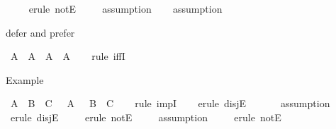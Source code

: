 \begin{isabellebody}
\ \ \ \isamarkupfalse%
\ {\isacharparenleft}{\kern0pt}erule\ notE{\isacharparenright}{\kern0pt}\isanewline
\ \ \ \isamarkupfalse%
\ assumption\isanewline
\ \ \isamarkupfalse%
\ assumption\isanewline
\ \ \isamarkupfalse%
%
\endisatagproof
{\isafoldproof}%
%
\isadelimproof
%
\endisadelimproof
%
\begin{isamarkuptext}%
defer and prefer%
\end{isamarkuptext}\isamarkuptrue%
\isamarkupfalse%
\ {\isachardoublequoteopen}{\isacharparenleft}{\kern0pt}A\ {\isasymor}\ A{\isacharparenright}{\kern0pt}\ {\isacharequal}{\kern0pt}\ {\isacharparenleft}{\kern0pt}A\ {\isasymand}\ A{\isacharparenright}{\kern0pt}{\isachardoublequoteclose}\isanewline
%
\isadelimproof
\ \ %
\endisadelimproof
%
\isatagproof
{}\isamarkupfalse%
\ {\isacharparenleft}{\kern0pt}rule\ iffI{\isacharparenright}{\kern0pt}\isanewline
\ \ \isamarkupfalse%
\ {}\isanewline
\ \ \isamarkupfalse%
\isanewline
\ \ \isamarkupfalse%
%
\endisatagproof
{\isafoldproof}%
%
\isadelimproof
%
\endisadelimproof
%
\begin{isamarkuptext}%
Example%
\end{isamarkuptext}\isamarkuptrue%
\isamarkupfalse%
\ {\isachardoublequoteopen}A\ {\isasymlongrightarrow}\ {\isacharparenleft}{\kern0pt}B\ {\isasymor}\ C{\isacharparenright}{\kern0pt}\ {\isasymlongrightarrow}\ {\isacharparenleft}{\kern0pt}{\isasymnot}\ A\ {\isasymor}\ {\isasymnot}\ B{\isacharparenright}{\kern0pt}\ {\isasymlongrightarrow}\ C{\isachardoublequoteclose}\isanewline
%
\isadelimproof
\ \ %
\endisadelimproof
%
\isatagproof
{}\isamarkupfalse%
\ {\isacharparenleft}{\kern0pt}rule\ impI{\isacharparenright}{\kern0pt}{\isacharplus}{\kern0pt}\isanewline
\ \ \isamarkupfalse%
\ {\isacharparenleft}{\kern0pt}erule\ disjE{\isacharparenright}{\kern0pt}\isanewline
\ \ \ \isamarkupfalse%
\ \isamarkupfalse%
\ assumption\isanewline
\ \ \isamarkupfalse%
\ {\isacharparenleft}{\kern0pt}erule\ disjE{\isacharparenright}{\kern0pt}\isanewline
\ \ \ \isamarkupfalse%
\ {\isacharparenleft}{\kern0pt}erule\ notE{\isacharparenright}{\kern0pt}\isanewline
\ \ \ \isamarkupfalse%
\ assumption\isanewline
\ \ \ \isamarkupfalse%
\ {\isacharparenleft}{\kern0pt}erule\ notE{\isacharparenright}{\kern0pt}\isanewline
\ \ \isamarkupfalse%

\end{isabellebody}
